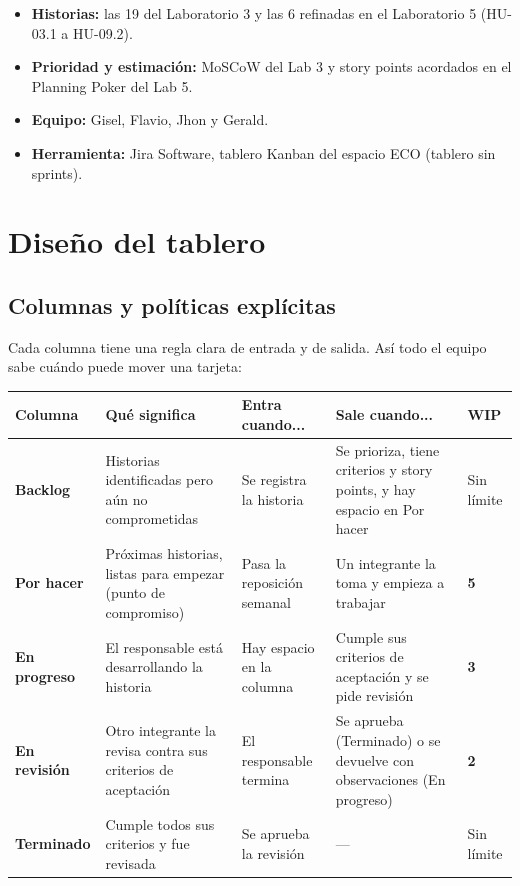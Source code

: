 \documentclass[11pt,a4paper]{article}
\begin{document}
\begin{itemize}
  \item \textbf{Historias:} las 19 del Laboratorio 3 y las 6 refinadas en el Laboratorio 5 (HU-03.1 a HU-09.2).
  \item \textbf{Prioridad y estimación:} MoSCoW del Lab 3 y story points acordados en el Planning Poker del Lab 5.
  \item \textbf{Equipo:} Gisel, Flavio, Jhon y Gerald.
  \item \textbf{Herramienta:} Jira Software, tablero Kanban del espacio ECO (tablero sin sprints).
\end{itemize}

\section{Diseño del tablero}

\subsection{Columnas y políticas explícitas}

Cada columna tiene una regla clara de entrada y de salida. Así todo el equipo sabe cuándo puede mover una tarjeta:

\begin{center}
\small
\begin{tabularx}{\linewidth}{L{2cm} Y Y Y C{1.4cm}}
\toprule
\textbf{Columna} & \textbf{Qué significa} & \textbf{Entra cuando...} & \textbf{Sale cuando...} & \textbf{WIP} \\
\midrule
\textbf{Backlog} & Historias identificadas pero aún no comprometidas & Se registra la historia & Se prioriza, tiene criterios y story points, y hay espacio en Por hacer & Sin límite \\
\textbf{Por hacer} & Próximas historias, listas para empezar (punto de compromiso) & Pasa la reposición semanal & Un integrante la toma y empieza a trabajar & \textbf{5} \\
\textbf{En progreso} & El responsable está desarrollando la historia & Hay espacio en la columna & Cumple sus criterios de aceptación y se pide revisión & \textbf{3} \\
\textbf{En revisión} & Otro integrante la revisa contra sus criterios de aceptación & El responsable termina & Se aprueba (Terminado) o se devuelve con observaciones (En progreso) & \textbf{2} \\
\textbf{Terminado} & Cumple todos sus criterios y fue revisada & Se aprueba la revisión & --- & Sin límite \\
\bottomrule
\end{tabularx}
\end{center}
\end{document}
